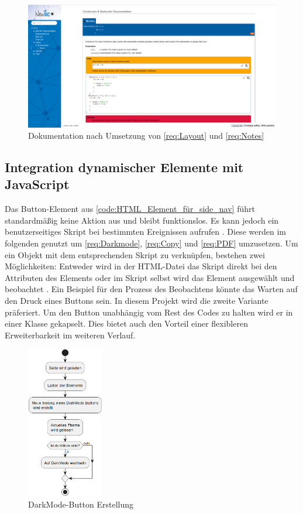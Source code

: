 \documentclass[11pt,a4paper]{report}
\begin{document}
\begin{figure}[h]
    \centering
     \includegraphics[width=\textwidth]{images/Doxygen_A1undA2_Req.png}
    \caption{Dokumentation nach Umsetzung von \ref{req:Layout} und \ref{req:Notes}}
    \label{fig:doxygen-before}
\end{figure}


\subsection{Integration dynamischer Elemente mit JavaScript}
Das Button-Element aus \ref{code:HTML_Element_für_side_nav} führt standardmäßig keine Aktion aus und bleibt funktionslos. Es kann jedoch ein benutzerseitiges Skript bei bestimmten Ereignissen aufrufen \cite{Button_Element}. Diese werden im folgenden genutzt um \ref{req:Darkmode}, \ref{req:Copy} und \ref{req:PDF} umzusetzen. Um ein Objekt mit dem entsprechenden Skript zu verknüpfen, bestehen zwei Möglichkeiten: Entweder wird in der HTML-Datei das Skript direkt bei den Attributen des Elements oder im Skript selbst wird das Element ausgewählt und \glqq beobachtet \grqq{}. Ein Beispiel für den Prozess des Beobachtens könnte das Warten auf den Druck eines Buttons sein. In diesem Projekt wird die zweite Variante präferiert. Um den Button unabhängig vom Rest des Codes zu halten wird er in einer Klasse gekapselt. Dies bietet auch den Vorteil einer flexibleren Erweiterbarkeit im weiteren Verlauf.
\begin{figure}[h]
    \centering
    \includegraphics[width=0.3\textwidth]{images/Ini.png}
    \caption{DarkMode-Button Erstellung}
    \label{fig:DarkMode-ini}
\end{figure}
\end{document}
